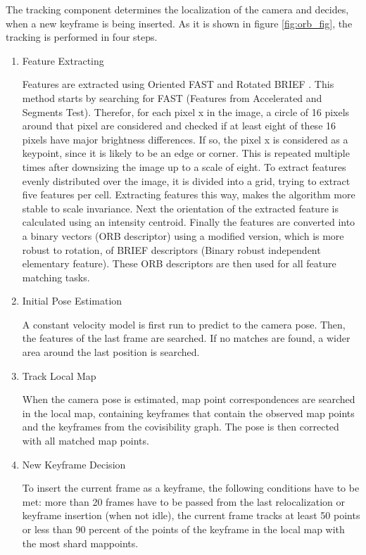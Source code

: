 	The tracking component determines the localization of the camera and decides, when a new keyframe is being inserted.
	As it is shown in figure \ref{fig:orb_fig}, the tracking is performed in four steps.
	
	\begin{enumerate}
	\item Feature Extracting 
	
	Features are extracted using Oriented FAST and Rotated BRIEF \cite{orb_feat}. This method starts by searching for 
	FAST (Features from Accelerated and Segments Test). Therefor, for each pixel x in the image, a circle of 16 pixels around that pixel
	are considered and checked if at least eight of these 16 pixels have major brightness differences. If so, the pixel x is considered as 
	a keypoint, since it is likely to be an edge or corner. This is repeated multiple times after downsizing the image up to a scale of eight. 
	To extract features evenly distributed over the image, it is divided into a grid, trying to extract five features per cell. 
	Extracting features this way, makes the algorithm more stable to scale invariance. 
	Next the orientation of the extracted feature is calculated using an intensity centroid. 
	Finally the features are converted into a binary vectors (ORB descriptor) using a modified version, which is more robust to rotation, of BRIEF descriptors (Binary robust independent elementary feature).
	These ORB descriptors are then used for all feature matching tasks. 
	
	
	\item Initial Pose Estimation
	
	A constant velocity model is first run to predict to the camera pose. Then, the features of the last frame are searched. If no matches are found, 
	a wider area around the last position is searched. 
	
	\item Track Local Map 
	
	When the camera pose is estimated, map point correspondences are searched in 
	the local map, containing keyframes that contain the observed map points and
	the keyframes from the covisibility graph. The pose is then corrected with all
	matched map points. 
	
	
	
	\item New Keyframe Decision 
	
	To insert the current frame as a keyframe, the following conditions have to be met:
	more than 20 frames have to be passed from the last relocalization or keyframe insertion (when not idle), 
    the current frame tracks at least 50 points or less than 90 percent of the points of the keyframe in the local 
    map with the most shard mappoints. 	
	
	
	\end{enumerate}
	
